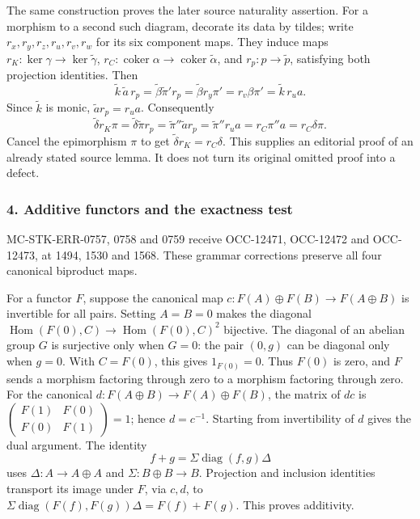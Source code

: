 The same construction proves the later source naturality assertion. For a morphism to a second such diagram, decorate its data by tildes; write \(r_x,r_y,r_z,r_u,r_v,r_w\) for its six component maps. They induce maps \(r_K:\ker\gamma\to\ker\widetilde\gamma\), \(r_C:\operatorname{coker}\alpha\to\operatorname{coker}\widetilde\alpha\), and \(r_p:p\to\widetilde p\), satisfying both projection identities. Then \[
\widetilde k\,\widetilde a\,r_p
=\widetilde\beta\widetilde\pi' r_p
=\widetilde\beta r_y\pi'
=r_v\beta\pi'
=\widetilde k\,r_u a.
\] Since \(\widetilde k\) is monic, \(\widetilde a r_p=r_u a\). Consequently \[
\widetilde\delta r_K\pi
=\widetilde\delta\widetilde\pi r_p
=\widetilde\pi''\widetilde a r_p
=\widetilde\pi''r_u a
=r_C\pi''a=r_C\delta\pi.
\] Cancel the epimorphism \(\pi\) to get \(\widetilde\delta r_K=r_C\delta\). This supplies an editorial proof of an already stated source lemma. It does not turn its original omitted proof into a defect.

\subsubsection{4. Additive functors and the exactness test}\label{additive-functors-and-the-exactness-test}

MC-STK-ERR-0757, 0758 and 0759 receive OCC-12471, OCC-12472 and OCC-12473, at 1494, 1530 and 1568. These grammar corrections preserve all four canonical biproduct maps.

For a functor \(F\), suppose the canonical map \(c:F(A)\oplus F(B)\to F(A\oplus B)\) is invertible for all pairs. Setting \(A=B=0\) makes the diagonal \(\operatorname{Hom}(F(0),C)\to\operatorname{Hom}(F(0),C)^2\) bijective. The diagonal of an abelian group \(G\) is surjective only when \(G=0\): the pair \((0,g)\) can be diagonal only when \(g=0\). With \(C=F(0)\), this gives \(1_{F(0)}=0\). Thus \(F(0)\) is zero, and \(F\) sends a morphism factoring through zero to a morphism factoring through zero. For the canonical \(d:F(A\oplus B)\to F(A)\oplus F(B)\), the matrix of \(dc\) is \(\left(\begin{smallmatrix}F(1)&F(0)\\F(0)&F(1)\end{smallmatrix}\right)=1\); hence \(d=c^{-1}\). Starting from invertibility of \(d\) gives the dual argument. The identity \[
f+g=\Sigma\operatorname{diag}(f,g)\Delta
\] uses \(\Delta:A\to A\oplus A\) and \(\Sigma:B\oplus B\to B\). Projection and inclusion identities transport its image under \(F\), via \(c,d\), to \(\Sigma\operatorname{diag}(F(f),F(g))\Delta=F(f)+F(g)\). This proves additivity.

